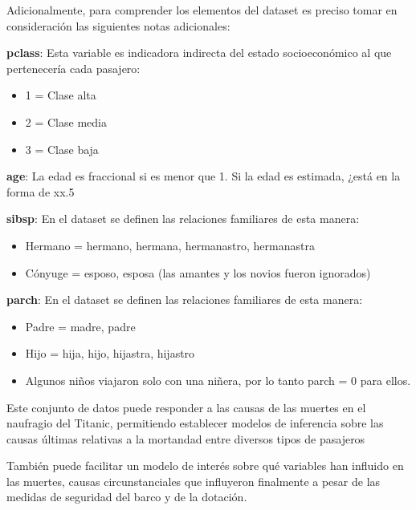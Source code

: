 \documentclass[]{article}
\providecommand{\tightlist}{%
  \setlength{\itemsep}{0pt}\setlength{\parskip}{0pt}}
\begin{document}
Adicionalmente, para comprender los elementos del dataset es preciso
tomar en consideración las siguientes notas adicionales:

\textbf{pclass}: Esta variable es indicadora indirecta del estado
socioeconómico al que pertenecería cada pasajero:

\begin{itemize}
\tightlist
\item
  1 = Clase alta\\
\item
  2 = Clase media\\
\item
  3 = Clase baja
\end{itemize}

\textbf{age}: La edad es fraccional si es menor que 1. Si la edad es
estimada, ¿está en la forma de xx.5

\textbf{sibsp}: En el dataset se definen las relaciones familiares de
esta manera:

\begin{itemize}
\tightlist
\item
  Hermano = hermano, hermana, hermanastro, hermanastra\\
\item
  Cónyuge = esposo, esposa (las amantes y los novios fueron ignorados)
\end{itemize}

\textbf{parch}: En el dataset se definen las relaciones familiares de
esta manera:

\begin{itemize}
\tightlist
\item
  Padre = madre, padre\\
\item
  Hijo = hija, hijo, hijastra, hijastro\\
\item
  Algunos niños viajaron solo con una niñera, por lo tanto parch = 0
  para ellos.
\end{itemize}

Este conjunto de datos puede responder a las causas de las muertes en el
naufragio del Titanic, permitiendo establecer modelos de inferencia
sobre las causas últimas relativas a la mortandad entre diversos tipos
de pasajeros

También puede facilitar un modelo de interés sobre qué variables han
influido en las muertes, causas circunstanciales que influyeron
finalmente a pesar de las medidas de seguridad del barco y de la
dotación.
\end{document}
